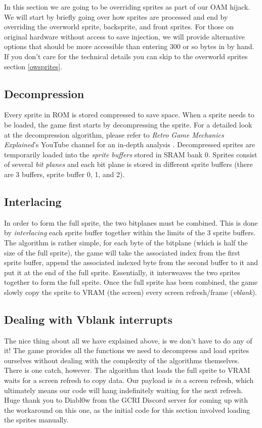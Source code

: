 \documentclass[../main.tex]{subfiles}
\begin{document}
    In this section we are going to be overriding sprites as part of our OAM hijack.  We will start by briefly going over how sprites are processed and end by overriding the overworld sprite, backsprite, and front sprites.  For those on original hardware without access to save injection, we will provide alternative options that should be more accessible than entering 300 or so bytes in by hand.  If you don't care for the technical details you can skip to the overworld sprites section \ref{owsprites}.

    \subsection{Decompression}
    Every sprite in ROM is stored compressed to save space.  When a sprite needs to be loaded, the game first starts by decompressing the sprite.  For a detailed look at the decompression algorithm, please refer to \textit{Retro Game Mechanics Explained}'s YouTube channel for an in-depth analysis \cite{decompalgo}.  Decompressed sprites are temporarily loaded into the \textit{sprite buffers} stored in SRAM bank 0.  Sprites consist of several \textit{bit planes} and each bit plane is stored in different sprite buffers (there are 3 buffers, sprite buffer 0, 1, and 2).

    \subsection{Interlacing}
    In order to form the full sprite, the two bitplanes must be combined.  This is done by \textit{interlacing} each sprite buffer together within the limits of the 3 sprite buffers.  The algorithm is rather simple, for each byte of the bitplane (which is half the size of the full sprite), the game will take the associated index from the first sprite buffer, append the associated indexed byte from the second buffer to it and put it at the end of the full sprite.  Essentially, it interweaves the two sprites together to form the full sprite.  Once the full sprite has been combined, the game slowly copy the sprite to VRAM (the screen) every screen refresh/frame (\textit{vblank}).

    \subsection{Dealing with Vblank interrupts}
    The nice thing about all we have explained above, is we don't have to do any of it!  The game provides all the functions we need to decompress and load sprites ourselves without dealing with the complexity of the algorithms themselves.  There is one catch, however.  The algorithm that loads the full sprite to VRAM waits for a screen refresh to copy data.  Our payload is \textit{in} a screen refresh, which ultimately means our code will hang indefinitely waiting for the next refresh.  Huge thank you to Diabl0w from the GCRI Discord server for coming up with the workaround on this one, as the initial code for this section involved loading the sprites manually.
\end{document}

